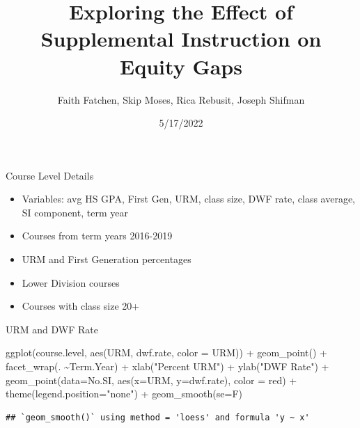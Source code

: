 \documentclass[
  ignorenonframetext,
]{beamer}
\title{Exploring the Effect of Supplemental Instruction on Equity Gaps}
\author{Faith Fatchen, Skip Moses, Rica Rebusit, Joseph Shifman}
\date{5/17/2022}
\newenvironment{Shaded}{\begin{snugshade}}{\end{snugshade}}
\newcommand{\AttributeTok}[1]{\textcolor[rgb]{0.77,0.63,0.00}{#1}}
\newcommand{\FunctionTok}[1]{\textcolor[rgb]{0.00,0.00,0.00}{#1}}
\newcommand{\NormalTok}[1]{#1}
\newcommand{\SpecialCharTok}[1]{\textcolor[rgb]{0.00,0.00,0.00}{#1}}
\newcommand{\StringTok}[1]{\textcolor[rgb]{0.31,0.60,0.02}{#1}}
\providecommand{\tightlist}{%
  \setlength{\itemsep}{0pt}\setlength{\parskip}{0pt}}
\begin{document}
\frame{\titlepage}

\begin{frame}{Course Level Details}
\protect\hypertarget{course-level-details}{}
\begin{itemize}
\tightlist
\item
  Variables: avg HS GPA, First Gen, URM, class size, DWF rate, class
  average, SI component, term year
\item
  Courses from term years 2016-2019
\item
  URM and First Generation percentages
\item
  Lower Division courses
\item
  Courses with class size 20+
\end{itemize}
\end{frame}

\begin{frame}[fragile]{URM and DWF Rate}
\protect\hypertarget{urm-and-dwf-rate}{}
\begin{Shaded}
\begin{Highlighting}[]
\FunctionTok{ggplot}\NormalTok{(course.level, }\FunctionTok{aes}\NormalTok{(URM, dwf.rate, }\AttributeTok{color =}\NormalTok{ URM)) }\SpecialCharTok{+} \FunctionTok{geom\_point}\NormalTok{() }\SpecialCharTok{+} \FunctionTok{facet\_wrap}\NormalTok{(. }\SpecialCharTok{\textasciitilde{}}\NormalTok{Term.Year) }\SpecialCharTok{+} \FunctionTok{xlab}\NormalTok{(}\StringTok{"Percent URM"}\NormalTok{) }\SpecialCharTok{+} \FunctionTok{ylab}\NormalTok{(}\StringTok{"DWF Rate"}\NormalTok{) }\SpecialCharTok{+} \FunctionTok{geom\_point}\NormalTok{(}\AttributeTok{data=}\NormalTok{No.SI, }\FunctionTok{aes}\NormalTok{(}\AttributeTok{x=}\NormalTok{URM, }\AttributeTok{y=}\NormalTok{dwf.rate), }\AttributeTok{color =} \StringTok{\textquotesingle{}red\textquotesingle{}}\NormalTok{) }\SpecialCharTok{+} \FunctionTok{theme}\NormalTok{(}\AttributeTok{legend.position=}\StringTok{"none"}\NormalTok{) }\SpecialCharTok{+} \FunctionTok{geom\_smooth}\NormalTok{(}\AttributeTok{se=}\NormalTok{F) }
\end{Highlighting}
\end{Shaded}

\begin{verbatim}
## `geom_smooth()` using method = 'loess' and formula 'y ~ x'
\end{verbatim}


\end{frame}
\end{document}
